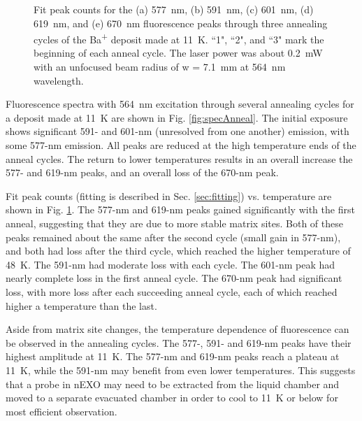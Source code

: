 \begin{figure}
                \caption{Fit peak counts for the (a) 577~nm, (b) 591~nm, (c) 601~nm, (d) 619~nm, and (e) 670~nm fluorescence peaks through three annealing cycles of the Ba\textsuperscript{+} deposit made at 11~K.  ``1", ``2", and ``3" mark the beginning of each anneal cycle.  The laser power was about 0.2~mW with an unfocused beam radius of w = 7.1~mm at 564~nm wavelength.}
\label{fig:annealGrn}
\end{figure}

Fluorescence spectra with 564~nm excitation through several annealing cycles for a deposit made at 11~K are shown in Fig. \ref{fig:specAnneal}.  The initial exposure shows significant 591- and 601-nm (unresolved from one another) emission, with some 577-nm emission.  All peaks are reduced at the high temperature ends of the anneal cycles.  The return to lower temperatures results in an overall increase the 577- and 619-nm peaks, and an overall loss of the 670-nm peak.  

Fit peak counts (fitting is described in Sec. \ref{sec:fitting}) vs. temperature are shown in Fig. \ref{fig:annealGrn}.  The 577-nm and 619-nm peaks gained significantly with the first anneal, suggesting that they are due to more stable matrix sites.  Both of these peaks remained about the same after the second cycle (small gain in 577-nm), and both had loss after the third cycle, which reached the higher temperature of 48~K.  The 591-nm had moderate loss with each cycle.  The 601-nm peak had nearly complete loss in the first anneal cycle.  The 670-nm peak had significant loss, with more loss after each succeeding anneal cycle, each of which reached higher a temperature than the last.




Aside from matrix site changes, the temperature dependence of fluorescence can be observed in the annealing cycles.  The 577-, 591- and 619-nm peaks have their highest amplitude at 11~K.  The 577-nm and 619-nm peaks reach a plateau at 11~K, while the 591-nm may benefit from even lower temperatures.  This suggests that a probe in nEXO may need to be extracted from the liquid chamber and moved to a separate evacuated chamber in order to cool to 11~K or below for most efficient observation.  

